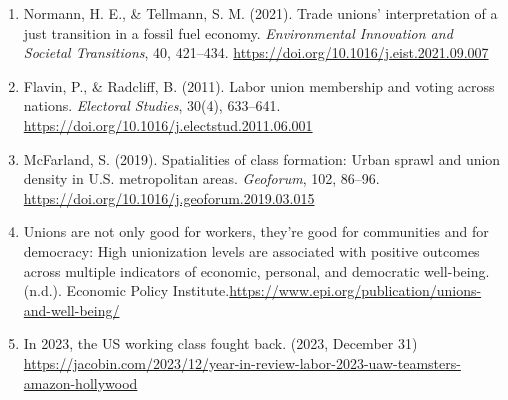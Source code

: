 \documentclass[11pt]{article}\usepackage[]{graphicx}\usepackage[]{xcolor}
\begin{document}
\begin{enumerate}
  \item Normann, H. E., \& Tellmann, S. M. (2021). Trade unions' interpretation of a just transition in a fossil fuel economy. \textit{Environmental Innovation and Societal Transitions}, 40, 421–434. \url{https://doi.org/10.1016/j.eist.2021.09.007}
  
  \item Flavin, P., \& Radcliff, B. (2011). Labor union membership and voting across nations. \textit{Electoral Studies}, 30(4), 633–641. \url{https://doi.org/10.1016/j.electstud.2011.06.001}
  
  \item McFarland, S. (2019). Spatialities of class formation: Urban sprawl and union density in U.S. metropolitan areas. \textit{Geoforum}, 102, 86–96. \url{https://doi.org/10.1016/j.geoforum.2019.03.015}

  \item Unions are not only good for workers, they’re good for communities and for democracy: High unionization levels are associated with positive outcomes across multiple indicators of economic, personal, and democratic well-being. (n.d.). Economic Policy Institute.\url{https://www.epi.org/publication/unions-and-well-being/}

  \item In 2023, the US working class fought back. (2023, December 31) \url {https://jacobin.com/2023/12/year-in-review-labor-2023-uaw-teamsters-amazon-hollywood}
\end{enumerate}
\end{document}

